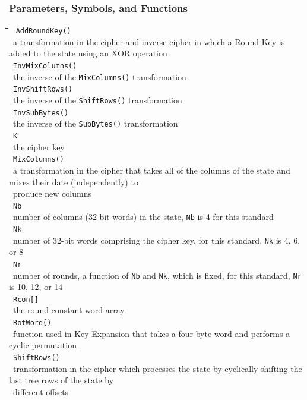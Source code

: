 \documentclass[10pt,letterpaper]{scrartcl}
\newcommand{\tbul}{\textbullet}
\newcommand{\tend}{\>\textendash}
\newcommand{\tabDef}{\hspace{2em}\=\hspace{2em}\=\hspace{2em}\=\hspace{2em}\=\kill}
\begin{document}
\subsubsection*{Parameters, Symbols, and Functions}\begin{tabbing}\tabDef 
\tbul\ \texttt{AddRoundKey()}\\
    \tend\ a transformation in the cipher and inverse cipher in which a Round Key is added to the state using an XOR operation \\
\tbul\ \texttt{InvMixColumns()} \\
    \tend\ the inverse of the \texttt{MixColumns()} transformation \\
\tbul\ \texttt{InvShiftRows()} \\
    \tend\ the inverse of the \texttt{ShiftRows()} transformation \\
\tbul\ \texttt{InvSubBytes()} \\
    \tend\ the inverse of the \texttt{SubBytes()} transformation \\
\tbul\ \texttt{K} \\
    \tend\ the cipher key \\
\tbul\ \texttt{MixColumns()} \\
    \tend\ a transformation in the cipher that takes all of the columns of the state and mixes their date (independently) to\\ \>\ produce new columns \\
\tbul\ \texttt{Nb} \\
    \tend\ number of columns (32-bit words) in the state, \texttt{Nb} is 4 for this standard \\
\tbul\ \texttt{Nk} \\
    \tend\ number of 32-bit words comprising the cipher key, for this standard, \texttt{Nk} is 4, 6, or 8 \\
\tbul\ \texttt{Nr} \\
    \tend\ number of rounds, a function of \texttt{Nb} and \texttt{Nk}, which is fixed, for this standard, \texttt{Nr} is 10, 12, or 14 \\
\tbul\ \texttt{Rcon[]} \\
    \tend\ the round constant word array \\
\tbul\ \texttt{RotWord()} \\
    \tend\ function used in Key Expansion that takes a four byte word and performs a cyclic permutation \\
\tbul\ \texttt{ShiftRows()} \\
    \tend\ transformation in the cipher which processes the state by cyclically shifting the last tree rows of the state by\\ \>\ different offsets \\

\end{tabbing}
\end{document}
